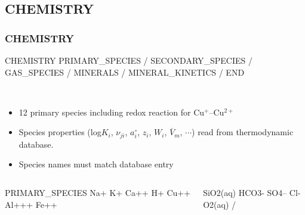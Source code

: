 \documentclass{beamer}
\begin{document}
\subsection{CHEMISTRY}

\begin{frame}\frametitle{\bf CHEMISTRY}

\begin{semiverbatim}

CHEMISTRY
  PRIMARY_SPECIES
  /
  SECONDARY_SPECIES
  /
  GAS_SPECIES
  /
  MINERALS
  /
  MINERAL_KINETICS
  /
END
\end{semiverbatim}

\newpage
~

\begin{itemize}

\item 12 primary species including redox reaction for Cu$^+$--Cu$^{2+}$
\item Species properties (log$K_i$, $\nu_{ji}$, $a_i^\circ$, $z_i$, $W_i$, $\overline V_m$, $\cdots$) read from thermodynamic database.
\item Species names must match database entry
\end{itemize}
\begin{columns}[c]
\begin{semiverbatim}
  PRIMARY_SPECIES
    Na+
    K+
    Ca++
    H+
    Cu++
    Al+++
    Fe++
\end{semiverbatim}
\begin{semiverbatim}
    SiO2(aq)
    HCO3-
    SO4--
    Cl-
    O2(aq)
  /
\end{semiverbatim}
  \end{columns}


\end{frame}
\end{document}
